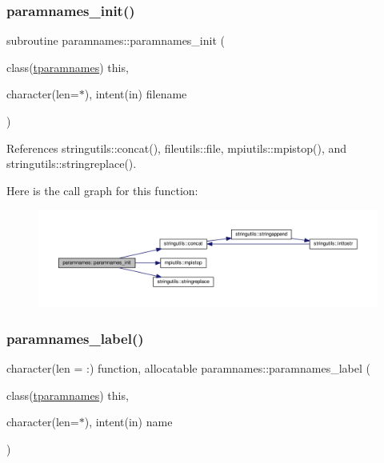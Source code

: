 \mbox{\label{namespaceparamnames_a1e5be5e1dda784956ba3a9d7985e7f15}} 
\subsubsection{\texorpdfstring{paramnames\+\_\+init()}{paramnames\_init()}}
{\footnotesize\ttfamily subroutine paramnames\+::paramnames\+\_\+init (\begin{DoxyParamCaption}\item[{class(\mbox{\hyperlink{structparamnames_1_1tparamnames}{tparamnames}})}]{this,  }\item[{character(len=$\ast$), intent(in)}]{filename }\end{DoxyParamCaption})\hspace{0.3cm}{\ttfamily [private]}}



References stringutils\+::concat(), fileutils\+::file, mpiutils\+::mpistop(), and stringutils\+::stringreplace().

Here is the call graph for this function\+:
\nopagebreak
\begin{figure}[H]
\begin{center}
\leavevmode
\includegraphics[width=350pt]{namespaceparamnames_a1e5be5e1dda784956ba3a9d7985e7f15_cgraph}
\end{center}
\end{figure}
\mbox{\label{namespaceparamnames_a67f4dfa5bf287848c1f621644fd7d32b}} 
\subsubsection{\texorpdfstring{paramnames\+\_\+label()}{paramnames\_label()}}
{\footnotesize\ttfamily character(len = \+:) function, allocatable paramnames\+::paramnames\+\_\+label (\begin{DoxyParamCaption}\item[{class(\mbox{\hyperlink{structparamnames_1_1tparamnames}{tparamnames}})}]{this,  }\item[{character(len=$\ast$), intent(in)}]{name }\end{DoxyParamCaption})\hspace{0.3cm}{\ttfamily [private]}}

